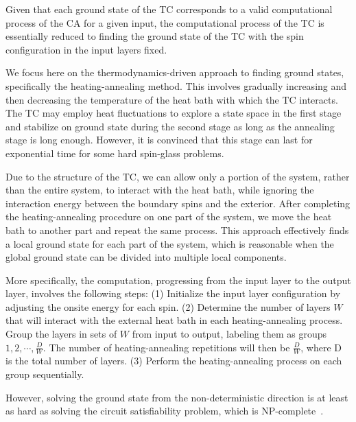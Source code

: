 \documentclass[twocolumn,superscriptaddress,english,showpacs,longbibliography]{revtex4-2}
\begin{document}
Given that each ground state of the TC corresponds to a valid computational process of the CA for a given input, the computational process of the TC is essentially reduced to finding the ground state of the TC with the spin configuration in the input layers fixed.

We focus here on the thermodynamics-driven approach to finding ground states, specifically the heating-annealing method. This involves gradually increasing and then decreasing the temperature of the heat bath with which the TC interacts. The TC may employ heat fluctuations to explore a state space in the first stage and stabilize on ground state during the second stage as long as the annealing stage is long enough. However, it is convinced that this stage can last for exponential time for some hard spin-glass problems.

Due to the structure of the TC, we can allow only a portion of the system, rather than the entire system, to interact with the heat bath, while ignoring the interaction energy between the boundary spins and the exterior. After completing the heating-annealing procedure on one part of the system, we move the heat bath to another part and repeat the same process. This approach effectively finds a local ground state for each part of the system, which is reasonable when the global ground state can be divided into multiple local components.

More specifically, the computation, progressing from the input layer to the output layer, involves the following steps: (1) Initialize the input layer configuration by adjusting the onsite energy for each spin. (2) Determine the number of layers $W$ that will interact with the external heat bath in each heating-annealing process. Group the layers in sets of $W$ from input to output, labeling them as groups $1, 2, \cdots, \frac{D}{W}$. The number of heating-annealing repetitions will then be $\frac{D}{W}$, where D is the total number of layers. (3) Perform the heating-annealing process on each group sequentially.

However, solving the ground state from the non-deterministic direction is at least as hard as solving the circuit satisfiability problem, which is NP-complete~\cite{Moore2011}.

\end{document}
